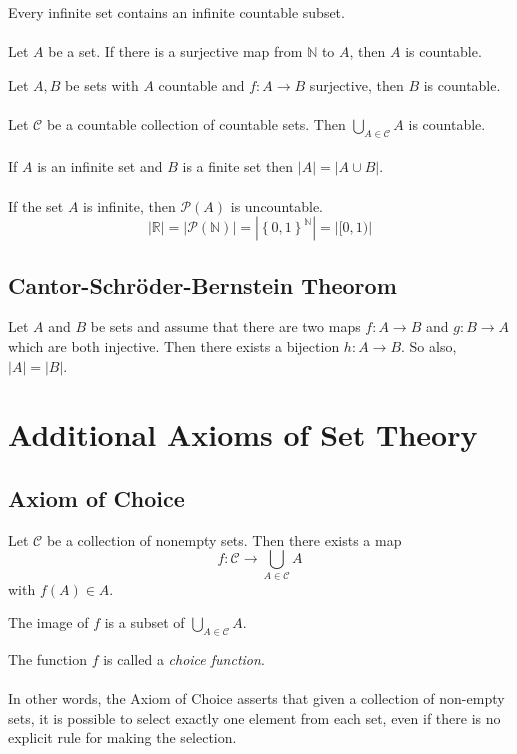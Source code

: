 \documentclass[fleqn]{article}
\begin{document}
Every infinite set contains an infinite countable subset.\\
\\
Let $A$ be a set. If there is a surjective map from $\mathbb{N}$ to $A$, then $A$ is countable.

Let $A,B$ be sets with $A$ countable and $f : A \to B$ surjective, then $B$ is countable.\\
\\
Let $\mathscr{C}$ be a countable collection of countable sets. Then $\bigcup_{A \in \mathscr{C}} A$ is countable.\\
\\
If $A$ is an infinite set and $B$ is a finite set then $|A| = |A \cup B|$.\\
\\
If the set $A$ is infinite, then $\mathscr{P}(A)$ is uncountable.\\
\begin{equation*}
    | \mathbb{R} | = | \mathscr{P}(\mathbb{N}) | = | \left\{ 0,1 \right\}^{\mathbb{N}} | = | [0,1) |
\end{equation*}

\subsection{Cantor-Schr\"oder-Bernstein Theorom}
Let $A$ and $B$ be sets and assume that there are two maps $f : A \to B$ and
$g : B \to A$ which are both injective. Then there exists a bijection $h : A \to B$.
So also, $|A| = |B|$.

\section{Additional Axioms of Set Theory}
\subsection{Axiom of Choice}
Let $\mathscr{C}$ be a collection of nonempty sets. Then there exists a map
\begin{equation*}
    f : \mathscr{C} \to \bigcup_{A \in \mathscr{C}} A
\end{equation*}
with $f(A) \in A$.

The image of $f$ is a subset of $\bigcup_{A \in \mathscr{C}} A$.

The function $f$ is called a \textit{choice function}.\\
\\
In other words, the Axiom of Choice asserts that given a collection of non-empty sets,
it is possible to select exactly one element from each set, even if there is no
explicit rule for making the selection.
\end{document}
